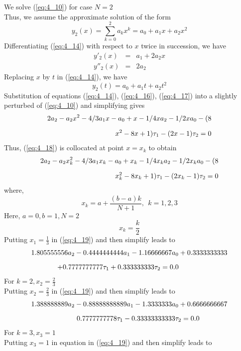 \documentclass[12pt]{report}
\newcommand{\sps}{\\[0.2cm]}
\newcommand{\refn}[1]{(\ref{#1})}
\newcommand{\refx}[1]{\refn{eq:#1}}
\newcommand{\sprime}{'}
\newcommand{\dprime}{''}
\newcommand{\NI}{\noindent}
\begin{document}
	\NI We solve \refx{4_10} for case $N=2$\sps
	Thus, we assume the approximate solution of the form
	\begin{equation}
		y_2(x) = \sum_{k=0}^{2}a_kx^k = a_0 + a_1x + a_2x^2 \label{eq:4_14}
	\end{equation}
	Differentiating \refx{4_14} with respect to $x$ twice in succession, we have
	\begin{eqnarray}
		y\sprime_2(x) &=& a_1 + 2a_2x \label{eq:4_15} \sps
		y\dprime_2(x) &=& 2a_2 \label{eq:4_16}
	\end{eqnarray}
	Replacing $x$ by $t$ in \refx{4_14}, we have
	\begin{equation}
		y_2(t) = a_0 + a_1t + a_2t^2 \label{eq:4_17}
	\end{equation}
	Substitution of equations \refx{4_14}, \refx{4_16}, \refx{4_17} into a slightly perturbed of \refx{4_10} and simplifying gives 
	\begin{eqnarray}
		2a_2 - a_2x^2 - 4/3a_1x - a_0 + x - 1/4xa_2 - 1/2xa_0 - (8\notag \sps
		x^2 - 8x + 1)\tau_1 - (2x-1)\tau_2 = 0 \label{eq:4_18}
	\end{eqnarray}
	Thus, \refx{4_18} is collocated at point $x=x_k$ to obtain
	\begin{eqnarray}
		2a_2 - a_2x_k^2 - 4/3a_1x_k - a_0 + x_k - 1/4x_ka_2 - 1/2x_ka_0 - (8\notag \sps
		x_k^2 - 8x_k + 1)\tau_1 - (2x_k-1)\tau_2 = 0 \label{eq:4_19}
	\end{eqnarray}
	where,
	\begin{equation}
		x_k = a + \frac{(b-a)k}{N+1}, ~~ k=1,2,3 \label{eq:4_20}
	\end{equation}
	Here, $a=0, b=1, N=2$
	\begin{equation*}
		x_k = \frac{k}{2}
	\end{equation*}
	Putting $x_1 = \frac{1}{3}$ in \refx{4_19} and then simplify leads to
	\begin{eqnarray}
		1.805555556a_2 - 0.4444444444a_1 - 1.16666667a_0 + 0.3333333333 \notag \sps
		 + 0.7777777777\tau_1 + 0.333333333\tau_2 = 0.0 ~~~~~~~~~~~~~~~~~~~~~\label{eq:4_21}
	\end{eqnarray} 
	For $k=2, x_2 = \frac{2}{3}$\sps
	Putting $x_2=\frac{2}{3}$ in \refx{4_19} and then simplify leads to
	\begin{eqnarray}
		1.388888889a_2 - 0.88888888889a_1 - 1.3333333a_0 + 0.6666666667\notag \sps
		0.7777777778\tau_1 - 0.33333333333\tau_2 = 0.0~~~~~~~~~~~~ \label{eq:4_22}
	\end{eqnarray}
	For $k=3, x_3 = 1$\sps
	Putting $x_3 =1$ in equation in \refx{4_19} and then simplify leads to
\end{document}
